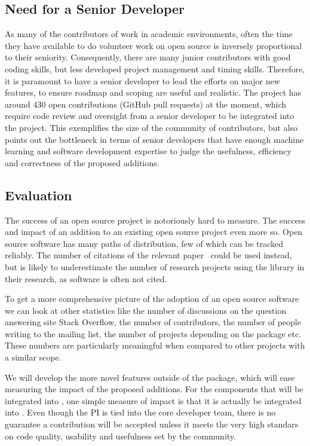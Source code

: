 \subsection{Need for a Senior Developer}
As many of the contributors of \sklearn{} work in academic environments,
often the time they have available to do volunteer work on open source is
inversely proportional to their seniority.
Consequently, there are many junior contributors with good coding skills,
but less developed project management and timing skills.
Therefore, it is paramount to have a senior developer to lead the efforts
on major new features, to ensure roadmap and scoping are useful and realistic.
The \sklearn{} project has around 430 open contributions (GitHub pull requests) at the moment,
which require code review and oversight from a senior developer to be integrated
into the project. This exemplifies the size of the community of contributors,
but also points out the bottleneck in terms of senior developers that
have enough machine learning and software development expertise to judge
the usefulness, efficiency and correctness of the proposed additions.


\subsection{Evaluation}
The success of an open source project is notoriously hard to measure. The
success and impact of an addition to an existing open source project even more
so. Open source software has many paths of distribution, few of which can
be tracked reliably.
The number of citations of the relevant paper~\autocite{pedregosa2011scikit}
could be used instead, but is likely to underestimate the number of research
projects using the \sklearn{} library in their research, as software is often
not cited.

To get a more comprehensive picture of the adoption of an open source software
we can look at other statistics like the number of discussions on the question
answering site Stack Overflow, the number of contributors, the number of people
writing to the mailing list, the number of projects depending on the package
etc. These numbers are particularly meaningful when compared to other projects
with a similar scope.

We will develop the more novel features outside of the \sklearn{} package, which will
ease measuring the impact of the proposed additions. For the components that will
be integrated into \sklearn{}, one simple measure of impact
is that it is actually be integrated into \sklearn{}.
Even though the PI is tied into the core developer team, there is no guarantee
a contribution will be accepted unless it meets the very high standars
on code quality, usability and usefulness set by the community.

